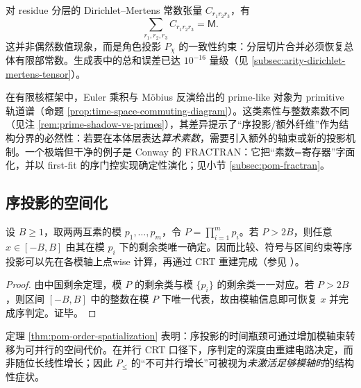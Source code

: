 \begin{remark}[分层常数的总和守恒]\label{rem:pom-chi-sum}
对 residue 分层的 Dirichlet--Mertens 常数张量 $C_{r_1r_2r_3}$，有
\[
\sum_{r_1,r_2,r_3} C_{r_1r_2r_3}=\mathsf{M}.
\]
这并非偶然数值现象，而是角色投影 $P_\chi$ 的一致性约束：分层切片合并必须恢复总体有限部常数。生成表中的总和误差已达 $10^{-16}$ 量级（见 \ref{subsec:arity-dirichlet-mertens-tensor}）。
\end{remark}

\begin{remark}[有限核的素数影子与算术素数的分界]
在有限核框架中，Euler 乘积与 Möbius 反演给出的 prime-like 对象为 primitive 轨道谱（命题 \ref{prop:time-space-commuting-diagram}）。这类素性与整数素数不同（见注 \ref{rem:prime-shadow-vs-primes}），其差异提示了“序投影/额外纤维”作为结构分界的必然性：若要在本体层表达\emph{算术素数}，需要引入额外的轴束或新的投影机制。一个极端但干净的例子是 Conway 的 FRACTRAN：它把“素数=寄存器”字面化，并以 first-fit 的序门控实现确定性演化；见小节 \ref{subsec:pom-fractran}。
\end{remark}

\subsection{序投影的空间化}\label{subsec:pom-order-spatialization}
\begin{theorem}[序投影的空间化定律]\label{thm:pom-order-spatialization}
设 $B\ge 1$，取两两互素的模 $p_1,\dots,p_m$，令 $P=\prod_{i=1}^m p_i$。若 $P>2B$，则任意 $x\in[-B,B]$ 由其在模 $p_i$ 下的剩余类唯一确定。因而比较、符号与区间约束等序投影可以先在各模轴上点wise 计算，再通过 CRT 重建完成（参见 \cite{Apostol1976}）。
\end{theorem}
\begin{proof}
由中国剩余定理，模 $P$ 的剩余类与模 $\{p_i\}$ 的剩余类一一对应。若 $P>2B$，则区间 $[-B,B]$ 中的整数在模 $P$ 下唯一代表，故由模轴信息即可恢复 $x$ 并完成序判定。证毕。
\end{proof}

\begin{remark}[时间—空间转移的结构后果]
定理 \ref{thm:pom-order-spatialization} 表明：序投影的时间瓶颈可通过增加模轴束转移为可并行的空间代价。在并行 CRT 口径下，序判定的深度由重建电路决定，而非随位长线性增长；因此 $P_{\le}$ 的“不可并行增长”可被视为\emph{未激活足够模轴时}的结构性症状。
\end{remark}

